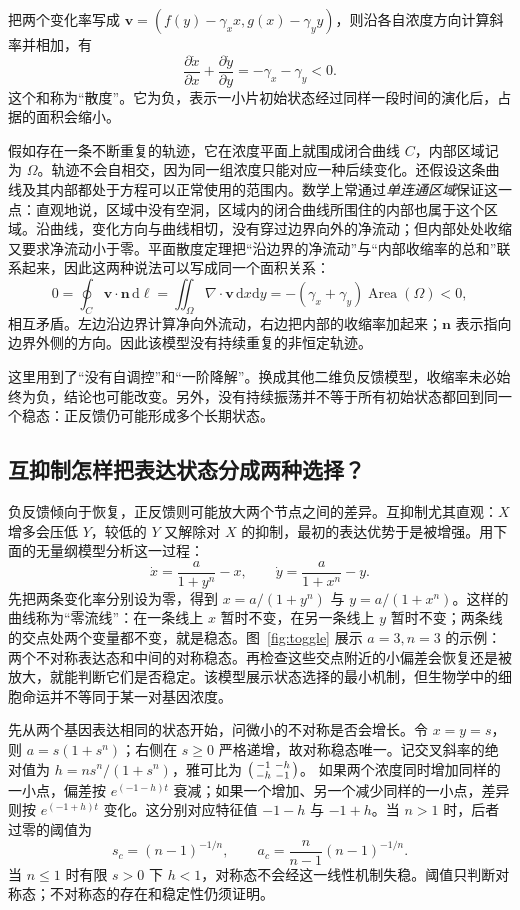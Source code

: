 \documentclass[11pt,a4paper,UTF8,fontset=fandol]{ctexart}
\newcommand{\dd}{\mathrm d}\newcommand{\R}{\mathbb R}\newcommand{\ssv}{\mathrm{ss}}
\begin{document}
把两个变化率写成 $\bm v=(f(y)-\gamma_xx,g(x)-\gamma_yy)$，则沿各自浓度方向计算斜率并相加，有
\[
\frac{\partial\dot x}{\partial x}+\frac{\partial\dot y}{\partial y}=-\gamma_x-\gamma_y<0.
\]
这个和称为“散度”。它为负，表示一小片初始状态经过同样一段时间的演化后，占据的面积会缩小。

假如存在一条不断重复的轨迹，它在浓度平面上就围成闭合曲线 $C$，内部区域记为 $\Omega$。轨迹不会自相交，因为同一组浓度只能对应一种后续变化。还假设这条曲线及其内部都处于方程可以正常使用的范围内。数学上常通过\emph{单连通区域}保证这一点：直观地说，区域中没有空洞，区域内的闭合曲线所围住的内部也属于这个区域。沿曲线，变化方向与曲线相切，没有穿过边界向外的净流动；但内部处处收缩又要求净流动小于零。平面散度定理把“沿边界的净流动”与“内部收缩率的总和”联系起来，因此这两种说法可以写成同一个面积关系：
\[
0=\oint_C\bm v\cdot\bm n\,\dd\ell
=\iint_\Omega\nabla\cdot\bm v\,\dd x\dd y
=-(\gamma_x+\gamma_y)\operatorname{Area}(\Omega)<0,
\]
相互矛盾。左边沿边界计算净向外流动，右边把内部的收缩率加起来；$\bm n$ 表示指向边界外侧的方向。因此该模型没有持续重复的非恒定轨迹。

这里用到了“没有自调控”和“一阶降解”。换成其他二维负反馈模型，收缩率未必始终为负，结论也可能改变。另外，没有持续振荡并不等于所有初始状态都回到同一个稳态：正反馈仍可能形成多个长期状态。

\subsection{互抑制怎样把表达状态分成两种选择？}
负反馈倾向于恢复，正反馈则可能放大两个节点之间的差异。互抑制尤其直观：$X$ 增多会压低 $Y$，较低的 $Y$ 又解除对 $X$ 的抑制，最初的表达优势于是被增强。用下面的无量纲模型分析这一过程：
\begin{equation}\dot x=\frac{a}{1+y^n}-x,\qquad\dot y=\frac{a}{1+x^n}-y.\label{eq:toggle}\end{equation}
先把两条变化率分别设为零，得到 $x=a/(1+y^n)$ 与 $y=a/(1+x^n)$。这样的曲线称为“零流线”：在一条线上 $x$ 暂时不变，在另一条线上 $y$ 暂时不变；两条线的交点处两个变量都不变，就是稳态。图~\ref{fig:toggle} 展示 $a=3,n=3$ 的示例：两个不对称表达态和中间的对称稳态。再检查这些交点附近的小偏差会恢复还是被放大，就能判断它们是否稳定。该模型展示状态选择的最小机制，但生物学中的细胞命运并不等同于某一对基因浓度。

先从两个基因表达相同的状态开始，问微小的不对称是否会增长。令 $x=y=s$，则 $a=s(1+s^n)$；右侧在 $s\geq0$ 严格递增，故对称稳态唯一。记交叉斜率的绝对值为
$h=ns^n/(1+s^n)$，雅可比为 $\begin{psmallmatrix}-1&-h\\-h&-1\end{psmallmatrix}$。
如果两个浓度同时增加同样的一小点，偏差按 $e^{(-1-h)t}$ 衰减；如果一个增加、另一个减少同样的一小点，差异则按 $e^{(-1+h)t}$ 变化。这分别对应特征值 $-1-h$ 与 $-1+h$。当 $n>1$ 时，后者过零的阈值为
\[
s_c=(n-1)^{-1/n},\qquad a_c=\frac n{n-1}(n-1)^{-1/n}.
\]
当 $n\leq1$ 时有限 $s>0$ 下 $h<1$，对称态不会经这一线性机制失稳。阈值只判断对称态；不对称态的存在和稳定性仍须证明。
\end{document}
